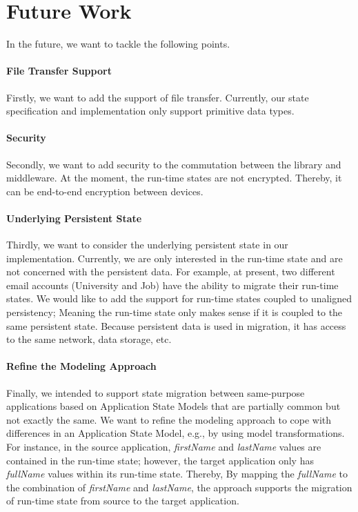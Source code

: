 \newpage
\section {Future Work}
In the future, we want to tackle the following points. 
\paragraph{File Transfer Support}
Firstly, we want to add the support of file transfer. Currently, our state specification and implementation only support primitive data types.

\paragraph{Security}
Secondly, we want to add security to the commutation between the library and middleware. At the moment, the run-time states are not encrypted. Thereby, it can be end-to-end encryption between devices.

\paragraph{Underlying Persistent State}
Thirdly, we want to consider the underlying persistent state in our implementation. Currently, we are only interested in the run-time state and are not concerned with the persistent data.
For example, at present, two different email accounts (University and Job) have the ability to migrate their run-time states. We would like to add the support for run-time states coupled to unaligned persistency; Meaning the run-time state only makes sense if it is coupled to the same persistent state. Because persistent data is used in migration, it has access to the same network, data storage, etc.

\paragraph{Refine the Modeling Approach}
Finally, we intended to support state migration between same-purpose applications based on Application State Models that are partially common but not exactly the same.
We want to refine the modeling approach to cope with differences in an Application State Model, e.g., by using model transformations.
For instance, in the source application, \textit{firstName} and \textit{lastName} values are contained in the run-time state; however, the target application only has \textit{fullName} values within its run-time state.
Thereby, By mapping the \textit{fullName} to the combination of \textit{firstName} and \textit{lastName}, the approach supports the migration of run-time state from source to the target application.

